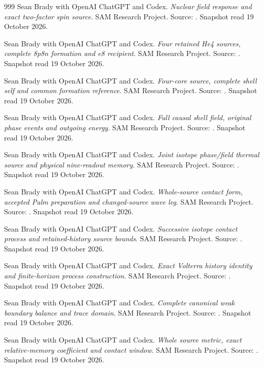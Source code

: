 \begin{thebibliography}{999}
 Sean Brady with OpenAI ChatGPT and Codex. \emph{Nuclear field response and exact two-factor spin source}. SAM Research Project. Source: . Snapshot read 19 October 2026.

 Sean Brady with OpenAI ChatGPT and Codex. \emph{Four retained He4 sources, complete 8p8n formation and e8 recipient}. SAM Research Project. Source: . Snapshot read 19 October 2026.

 Sean Brady with OpenAI ChatGPT and Codex. \emph{Four-core source, complete shell self and common formation reference}. SAM Research Project. Source: . Snapshot read 19 October 2026.

 Sean Brady with OpenAI ChatGPT and Codex. \emph{Full causal shell field, original phase events and outgoing energy}. SAM Research Project. Source: . Snapshot read 19 October 2026.

 Sean Brady with OpenAI ChatGPT and Codex. \emph{Joint isotope phase/field thermal source and physical nine-readout memory}. SAM Research Project. Source: . Snapshot read 19 October 2026.

 Sean Brady with OpenAI ChatGPT and Codex. \emph{Whole-source contact form, accepted Palm preparation and changed-source wave leg}. SAM Research Project. Source: . Snapshot read 19 October 2026.

 Sean Brady with OpenAI ChatGPT and Codex. \emph{Successive isotope contact process and retained-history source bounds}. SAM Research Project. Source: . Snapshot read 19 October 2026.

 Sean Brady with OpenAI ChatGPT and Codex. \emph{Exact Volterra history identity and finite-horizon process construction}. SAM Research Project. Source: . Snapshot read 19 October 2026.

 Sean Brady with OpenAI ChatGPT and Codex. \emph{Complete canonical weak boundary balance and trace domain}. SAM Research Project. Source: . Snapshot read 19 October 2026.

 Sean Brady with OpenAI ChatGPT and Codex. \emph{Whole source metric, exact relative-memory coefficient and contact window}. SAM Research Project. Source: . Snapshot read 19 October 2026.


\end{thebibliography}
